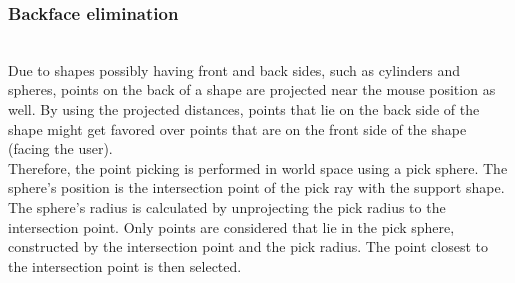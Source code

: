 \subsubsection{Backface elimination}
\\
Due to shapes possibly having front and back sides, such as cylinders and spheres, points on the back of a shape are projected near the mouse position as well. By using the projected distances, points that lie on the back side of the shape might get favored over points that are on the front side of the shape (facing the user). 
\\
Therefore, the point picking is performed in world space using a pick sphere. The sphere's position is the intersection point of the pick ray with the support shape. The sphere's radius is calculated by unprojecting the pick radius to the intersection point. Only points are considered that lie in the pick sphere, constructed by the intersection point and the pick radius. The point closest to the intersection point is then selected. 
\\
